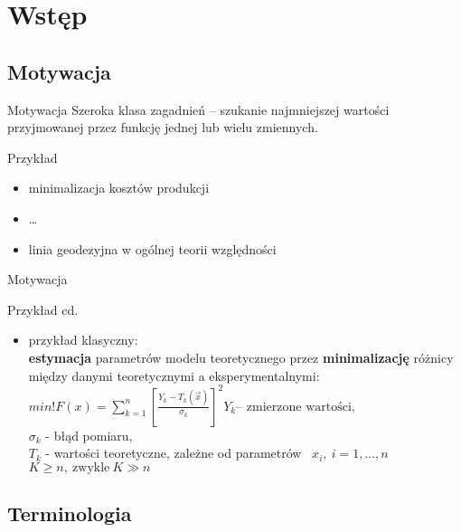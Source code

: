 \section{Wstęp}

\subsection{Motywacja}

  \begin{frame}{Motywacja}
    Szeroka klasa zagadnień -- szukanie najmniejszej wartości
    przyjmowanej przez funkcję jednej lub wielu zmiennych.

    \begin{exampleblock}{Przykład}
      \begin{itemize}
        \item minimalizacja kosztów produkcji
        \item \ldots
        \item linia geodezyjna w ogólnej teorii względności
      \end{itemize}
    \end{exampleblock}
  \end{frame}

  \begin{frame}{Motywacja}
    \begin{exampleblock}{Przykład cd.}
      \begin{itemize}
        \item przykład klasyczny:\\
        \textbf{estymacja} parametrów modelu teoretycznego
        przez \textbf{minimalizację} różnicy między danymi
        teoretycznymi a eksperymentalnymi:\\
        $
          min!F(x) = \sum_{k = 1}^{n} \left[ \frac{Y_k - T_k(\vec x)}{\sigma_k}
          \right] ^2 Y_k \text{-- zmierzone wartości,}
        $ \\
        $ \sigma_k $ - błąd pomiaru,\\
        $ T_k $ - wartości teoretyczne, zależne od parametrów~
        $ x_i{,}\ i=1{,} \dots {,}n $ \\
        $ K \geq n{,}\ \text{zwykle}\ K \gg n $
      \end{itemize}
    \end{exampleblock}
  \end{frame}

\subsection{Terminologia}

